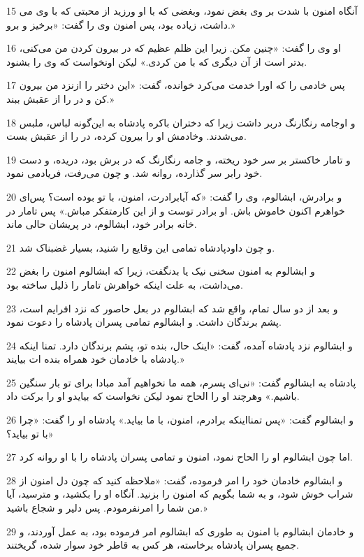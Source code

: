 \par 15 آنگاه امنون با شدت بر وی بغض نمود، وبغضی که با او ورزید از محبتی که با وی می داشت، زیاده بود، پس امنون وی را گفت: «برخیز و برو.»
\par 16 او وی را گفت: «چنین مکن. زیرا این ظلم عظیم که در بیرون کردن من می‌کنی، بدتر است از آن دیگری که با من کردی.» لیکن اونخواست که وی را بشنود.
\par 17 پس خادمی را که اورا خدمت می‌کرد خوانده، گفت: «این دختر را ازنزد من بیرون کن و در را از عقبش ببند.»
\par 18 و اوجامه رنگارنگ دربر داشت زیرا که دختران باکره پادشاه به این‌گونه لباس، ملبس می‌شدند. وخادمش او را بیرون کرده، در را از عقبش بست.
\par 19 و تامار خاکستر بر سر خود ریخته، و جامه رنگارنگ که در برش بود، دریده، و دست خود رابر سر گذارده، روانه شد. و چون می‌رفت، فریادمی نمود.
\par 20 و برادرش، ابشالوم، وی را گفت: «که آیابرادرت، امنون، با تو بوده است؟ پس‌ای خواهرم اکنون خاموش باش. او برادر توست و از این کارمتفکر مباش.» پس تامار در خانه برادر خود، ابشالوم، در پریشان حالی ماند.
\par 21 و چون داودپادشاه تمامی این وقایع را شنید، بسیار غضبناک شد.
\par 22 و ابشالوم به امنون سخنی نیک یا بدنگفت، زیرا که ابشالوم امنون را بغض می‌داشت، به علت اینکه خواهرش تامار را ذلیل ساخته بود.
\par 23 و بعد از دو سال تمام، واقع شد که ابشالوم در بعل حاصور که نزد افرایم است، پشم برندگان داشت. و ابشالوم تمامی پسران پادشاه را دعوت نمود.
\par 24 و ابشالوم نزد پادشاه آمده، گفت: «اینک حال، بنده تو، پشم برندگان دارد. تمنا اینکه پادشاه با خادمان خود همراه بنده ات بیایند.»
\par 25 پادشاه به ابشالوم گفت: «نی‌ای پسرم، همه ما نخواهیم آمد مبادا برای تو بار سنگین باشیم.» وهر‌چند او را الحاح نمود لیکن نخواست که بیایدو او را برکت داد.
\par 26 و ابشالوم گفت: «پس تمنااینکه برادرم، امنون، با ما بیاید.» پادشاه او را گفت: «چرا با تو بیاید؟»
\par 27 اما چون ابشالوم او را الحاح نمود، امنون و تمامی پسران پادشاه را با او روانه کرد.
\par 28 و ابشالوم خادمان خود را امر فرموده، گفت: «ملاحظه کنید که چون دل امنون از شراب خوش شود، و به شما بگویم که امنون را بزنید. آنگاه او را بکشید، و مترسید، آیا من شما را امرنفرمودم. پس دلیر و شجاع باشید.»
\par 29 و خادمان ابشالوم با امنون به طوری که ابشالوم امر فرموده بود، به عمل آوردند، و جمیع پسران پادشاه برخاسته، هر کس به قاطر خود سوار شده، گریختند.
